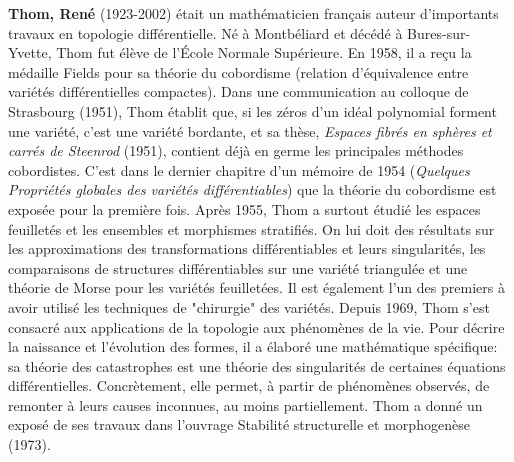 \textbf{Thom, René} (1923-2002) était un mathématicien français auteur d'importants travaux en topologie différentielle. Né à Montbéliard et décédé à Bures-sur-Yvette, Thom fut élève de l'École Normale Supérieure. En 1958, il a reçu la médaille Fields pour sa théorie du cobordisme (relation d'équivalence entre variétés différentielles compactes). Dans une communication au colloque de Strasbourg (1951), Thom établit que, si les zéros d'un idéal polynomial forment une variété, c'est une variété bordante, et sa thèse, \textit{Espaces fibrés en sphères et carrés de Steenrod} (1951), contient déjà en germe les principales méthodes cobordistes. C'est dans le dernier chapitre d'un mémoire de 1954 (\textit{Quelques Propriétés globales des variétés différentiables}) que la théorie du cobordisme est exposée pour la première fois. Après 1955, Thom a surtout étudié les espaces feuilletés et les ensembles et morphismes stratifiés. On lui doit des résultats sur les approximations des transformations différentiables et leurs singularités, les comparaisons de structures différentiables sur une variété triangulée et une théorie de Morse pour les variétés feuilletées. Il est également l'un des premiers à avoir utilisé les techniques de "chirurgie" des variétés. Depuis 1969, Thom s'est consacré aux applications de la topologie aux phénomènes de la vie. Pour décrire la naissance et l'évolution des formes, il a élaboré une mathématique spécifique: sa théorie des catastrophes est une théorie des singularités de certaines équations différentielles. Concrètement, elle permet, à partir de phénomènes observés, de remonter à leurs causes inconnues, au moins partiellement. Thom a donné un exposé de ses travaux dans l'ouvrage Stabilité structurelle et morphogenèse (1973).

